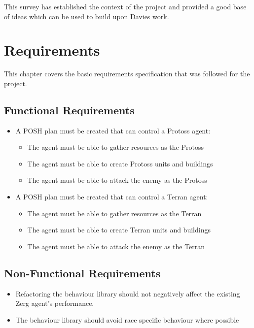 \documentclass[11pt,openright,a4paper]{report}
\begin{document}
This survey has established the context of the project and provided a good base of ideas which can be used to build upon Davies work.

\chapter{Requirements}
This chapter covers the basic requirements specification that was followed for the project.

\section{Functional Requirements}
\begin{itemize}
\item A POSH plan must be created that can control a Protoss agent:
    \begin{itemize}
    \item{The agent must be able to gather resources as the Protoss}
    \item{The agent must be able to create Protoss units and buildings}
    \item{The agent must be able to attack the enemy as the Protoss}
    \end{itemize}
\item A POSH plan must be created that can control a Terran agent:
    \begin{itemize}
    \item{The agent must be able to gather resources as the Terran}
    \item{The agent must be able to create Terran units and buildings}
    \item{The agent must be able to attack the enemy as the Terran}
    \end{itemize}
\end{itemize}
\section{Non-Functional Requirements}
\begin{itemize}
\item{Refactoring the behaviour library should not negatively affect the existing Zerg agent's performance.}
\item{The behaviour library should avoid race specific behaviour where possible}
\end{itemize}
\end{document}

